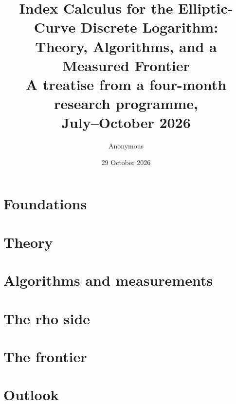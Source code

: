 \documentclass[10pt,a4paper,oneside]{report}
\title{Index Calculus for the Elliptic-Curve Discrete Logarithm:\\[6pt]
       {\Large Theory, Algorithms, and a Measured Frontier}\\[10pt]
       {\large A treatise from a four-month research programme,\\
       July--October 2026}}
\author{Anonymous}
\date{29 October 2026}
\theoremstyle{definition}
\theoremstyle{remark}
\begin{document}
\maketitle

\begin{abstract}

\end{abstract}

\tableofcontents



\part{Foundations}\label{part:foundations}





\part{Theory}\label{part:theory}





\part{Algorithms and measurements}\label{part:algorithms}












\part{The rho side}\label{part:rho}


\part{The frontier}\label{part:frontier}






\part{Outlook}\label{part:outlook}



\appendix





\end{document}
